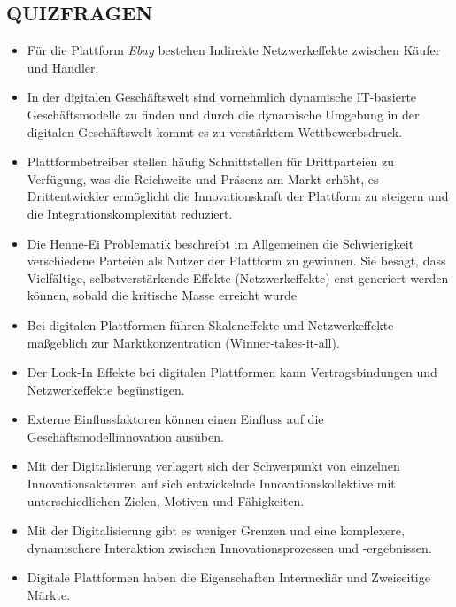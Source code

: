 \documentclass[12pt,a4paper]{article}
\begin{document}
\vspace{0.5cm}
\subsection{QUIZFRAGEN} %
\begin{itemize}
   \item Für die Plattform \emph{Ebay} bestehen Indirekte Netzwerkeffekte zwischen Käufer und Händler.
   
   \item In der digitalen Geschäftswelt sind vornehmlich dynamische IT-basierte Ge\-schäfts\-mo\-del\-le zu finden und durch die dynamische Umgebung in der digitalen Geschäftswelt kommt es zu verstärktem Wettbewerbsdruck.
   
   \item Plattformbetreiber stellen häufig Schnittstellen für Drittparteien zu Verfügung, was die Reichweite und Präsenz am Markt erhöht, es Drittentwickler ermöglicht die Innovationskraft der Plattform zu steigern und die Integrationskomplexität reduziert.
   
   \item Die Henne-Ei Problematik beschreibt im Allgemeinen die Schwierigkeit verschiedene Parteien als Nutzer der Plattform zu gewinnen.
         Sie besagt, dass Vielfältige, selbst\-ver\-stärk\-en\-de Effekte (Netzwerkeffekte) erst generiert werden können, sobald die kritische Masse erreicht wurde
   
   \item Bei digitalen Plattformen führen Skaleneffekte und Netzwerkeffekte maßgeblich zur Marktkonzentration (Winner-takes-it-all).
   
   \item Der Lock-In Effekte bei digitalen Plattformen kann Vertragsbindungen und Netzwerkeffekte begünstigen.
   
   \item Externe Einflussfaktoren können einen Einfluss auf die Geschäftsmodellinnovation ausüben.
   \item Mit der Digitalisierung verlagert sich der Schwerpunkt von einzelnen Innovationsakteuren auf sich entwickelnde Innovationskollektive mit unterschiedlichen Zielen, Motiven und Fähigkeiten.
   \item Mit der Digitalisierung gibt es weniger Grenzen und eine komplexere, dynamischere Interaktion zwischen Innovationsprozessen und -ergebnissen.
   
   \item Digitale Plattformen haben die Eigenschaften Intermediär und Zweiseitige Märkte.
\end{itemize}
\end{document}
